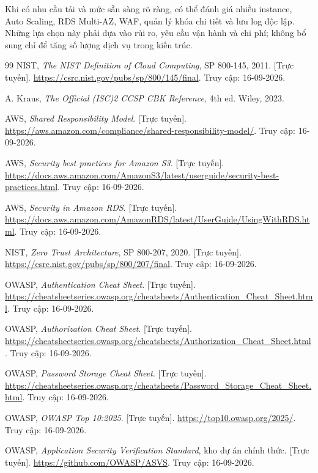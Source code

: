 Khi có nhu cầu tải và mức sẵn sàng rõ ràng, có thể đánh giá nhiều instance, Auto Scaling, RDS Multi-AZ, WAF, quản lý khóa chi tiết và lưu log độc lập. Những lựa chọn này phải dựa vào rủi ro, yêu cầu vận hành và chi phí; không bổ sung chỉ để tăng số lượng dịch vụ trong kiến trúc.
\clearpage
{}
\begin{thebibliography}{99}
\small
{} NIST, \textit{The NIST Definition of Cloud Computing}, SP 800-145, 2011. [Trực tuyến]. \url{https://csrc.nist.gov/pubs/sp/800/145/final}. Truy cập: 16-09-2026.

 A. Kraus, \textit{The Official (ISC)2 CCSP CBK Reference}, 4th ed. Wiley, 2023.

 AWS, \textit{Shared Responsibility Model}. [Trực tuyến]. \url{https://aws.amazon.com/compliance/shared-responsibility-model/}. Truy cập: 16-09-2026.

 AWS, \textit{Security best practices for Amazon S3}. [Trực tuyến]. \url{https://docs.aws.amazon.com/AmazonS3/latest/userguide/security-best-practices.html}. Truy cập: 16-09-2026.

 AWS, \textit{Security in Amazon RDS}. [Trực tuyến]. \url{https://docs.aws.amazon.com/AmazonRDS/latest/UserGuide/UsingWithRDS.html}. Truy cập: 16-09-2026.

 NIST, \textit{Zero Trust Architecture}, SP 800-207, 2020. [Trực tuyến]. \url{https://csrc.nist.gov/pubs/sp/800/207/final}. Truy cập: 16-09-2026.

 OWASP, \textit{Authentication Cheat Sheet}. [Trực tuyến]. \url{https://cheatsheetseries.owasp.org/cheatsheets/Authentication_Cheat_Sheet.html}. Truy cập: 16-09-2026.

 OWASP, \textit{Authorization Cheat Sheet}. [Trực tuyến]. \url{https://cheatsheetseries.owasp.org/cheatsheets/Authorization_Cheat_Sheet.html}. Truy cập: 16-09-2026.

 OWASP, \textit{Password Storage Cheat Sheet}. [Trực tuyến]. \url{https://cheatsheetseries.owasp.org/cheatsheets/Password_Storage_Cheat_Sheet.html}. Truy cập: 16-09-2026.

 OWASP, \textit{OWASP Top 10:2025}. [Trực tuyến]. \url{https://top10.owasp.org/2025/}. Truy cập: 16-09-2026.

 OWASP, \textit{Application Security Verification Standard}, kho dự án chính thức. [Trực tuyến]. \url{https://github.com/OWASP/ASVS}. Truy cập: 16-09-2026.


\end{thebibliography}
